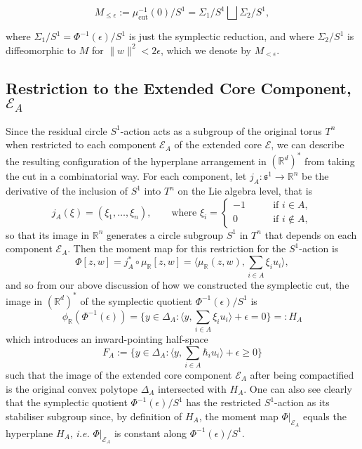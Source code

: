\documentclass[11pt]{amsart}
\newcommand{\st}{\ensuremath{:}}%
\newcommand{\ie}{\emph{i.e.} }
\newcommand{\m}{\mu}
\newcommand{\e}{\epsilon}
\newcommand{\RR}{\mathbb{R}}
\newcommand{\mc}[1]{\mathcal{#1}}
\newcommand{\mf}[1]{\mathfrak{#1}}
\newcommand{\mrr}{\mu_{\mathbb{R}}}
\newcommand{\prr}{\phi_{\mathbb{R}}}
\begin{document}
\begin{equation*}
	M_{\leq \e} := \m_{\text{cut}}^{-1}(0)/S^{1} = \Sigma_{1}/S^{1} \bigsqcup \Sigma_{2}/S^{1},
\end{equation*}

where $\Sigma_{1}/S^{1} = \Phi^{-1}(\e)/S^{1}$ is just the symplectic reduction, and where $\Sigma_{2}/S^{1}$ is diffeomorphic to $M$ for $\|w\|^{2} < 2\e$, which we denote by $M_{<\epsilon}$.

\subsection{Restriction to the Extended Core Component, $\mc{E}_{A}$}

Since the residual circle $S^{1}$-action acts as a subgroup of the original torus $T^{n}$ when restricted to each component $\mc{E}_{A}$ of the extended core $\mc{E}$, we can describe the resulting configuration of the hyperplane arrangement in $(\RR^{d})^{\ast}$ from taking the cut in a combinatorial way. For each component, let $j_{A}: \mf{s}^{1} \rightarrow \RR^{n}$ be the derivative of the inclusion of $S^{1}$ into $T^{n}$ on the Lie algebra level, that is
\begin{equation*}
	j_{A}( \xi  ) = (\xi_{1},\ldots, \xi_{n}),\qquad \text{where } \xi_{i} = 
	\begin{cases}
		-1\qquad&\text{if } i\in A,\\
		0\qquad &\text{if } i \not\in A,
	\end{cases}
\end{equation*}
so that its image in $\RR^{n}$ generates a circle subgroup $S^{1}$ in $T^{n}$ that depends on each component $\mc{E}_{A}$. Then the moment map for this restriction for the $S^{1}$-action is
\begin{equation*}
	\Phi[z,w] = j_{A}^{\ast} \circ \mrr[z,w] = \bigg\langle \mrr(z,w), \sum_{i\in A}\xi_{i} u_{i} \bigg\rangle,
\end{equation*}
and so from our above discussion of how we constructed the symplectic cut, the image in $(\RR^{d})^{\ast}$ of the symplectic quotient $\Phi^{-1}(\e)/S^{1}$ is
\begin{equation*}
	\prr(\Phi^{-1}(\e)) = \bigg\{ y \in \Delta_{A} \st \bigg\langle y, \sum_{i\in A}\xi_{i}u_{i}\bigg\rangle + \e = 0 \bigg\} =: H_{A}
\end{equation*}
which introduces an inward-pointing half-space
\begin{equation*}
	F_{A} := \bigg\{ y \in \Delta_{A} \st \bigg\langle y, \sum_{i\in A}\hbar_{i}u_{i}\bigg\rangle + \e \geq 0 \bigg\}
\end{equation*}
such that the image of the extended core component $\mc{E}_{A}$ after being compactified is the original convex polytope $\Delta_{A}$ intersected with $H_{A}$. One can also see clearly that the symplectic quotient $\Phi^{-1}(\e)/S^{1}$ has the restricted $S^{1}$-action as its stabiliser subgroup since, by definition of $H_{A}$, the moment map $\Phi|_{\mc{E}_{A}}$ equals the hyperplane $H_{A}$, \ie $\Phi|_{\mc{E}_{A}}$ is constant along $\Phi^{-1}(\epsilon)/S^{1}$.
\end{document}
